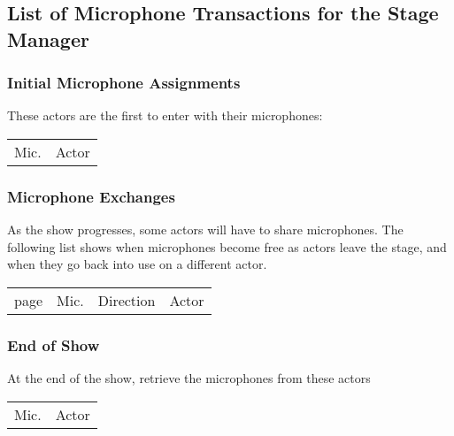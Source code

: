 \documentclass[letterpaper]{article}
\begin{document}
\vskip 0.25in

{\setlength{\parindent}{0in}

}

\subsection {List of Microphone Transactions for the Stage Manager}

\subsubsection {Initial Microphone Assignments}

These actors are the first to enter with their microphones:

\begin{center}
\begin{longtable}{|l|l|}
\hline Mic. & Actor \endhead \hline

\end{longtable}
\end{center}

\subsubsection {Microphone Exchanges}

As the show progresses, some actors will have to share microphones. The
following list shows when microphones become free as actors leave the
stage, and when they go back into use on a different actor.

\begin{center}
\begin{longtable}{|l|l|l|l|}
\hline page & Mic. & Direction & Actor \endhead \hline

\end{longtable}
\end{center}

\subsubsection {End of Show}

At the end of the show, retrieve the microphones from these actors

\begin{center}
\begin{longtable}{|l|l|}
\hline Mic. & Actor \endhead \hline

\end{longtable}
\end{center}
\end{document}
